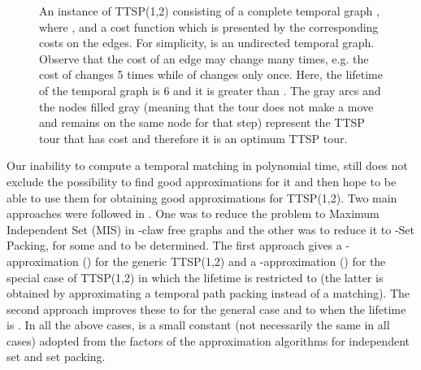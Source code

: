 \documentclass[oribibl, 11pt]{llncs}
\begin{document}
\begin{figure}[!hbtp]
\caption{An instance of TTSP(1,2) consisting of a complete temporal graph , where , and a cost function  which is presented by the corresponding costs on the edges. For simplicity,  is an undirected temporal graph. Observe that the cost of an edge may change many times, e.g. the cost of  changes 5 times while of  changes only once. Here, the lifetime of the temporal graph is 6 and it is greater than . The gray arcs and the nodes filled gray (meaning that the tour does not make a move and remains on the same node for that step) represent the TTSP tour  that has cost  and therefore it is an optimum TTSP tour.} \label{fig:tsp-example}
\end{figure}

Our inability to compute a temporal matching in polynomial time, still does not exclude the possibility to find good approximations for it and then hope to be able to use them for obtaining good approximations for TTSP(1,2). Two main approaches were followed in \cite{MS14}. One was to reduce the problem to {\sc Maximum Independent Set} ({\sc MIS}) in -claw free graphs and the other was to reduce it to {\sc -Set Packing}, for some  and  to be determined. The first approach gives a -approximation () for the generic TTSP(1,2) and a -approximation () for the special case of TTSP(1,2) in which the lifetime is restricted to  (the latter is obtained by approximating a temporal path packing instead of a matching). The second approach improves these to  for the general case and to  when the lifetime is . In all the above cases,  is a small constant (not necessarily the same in all cases) adopted from the factors of the approximation algorithms for independent set and set packing.
\end{document}
